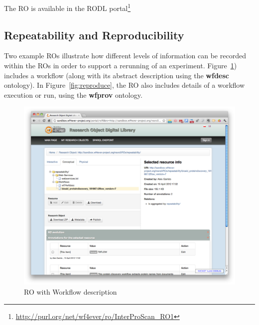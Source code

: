 The RO is available in the RODL portal\footnote{\url{http://purl.org/net/wf4ever/ro/InterProScan_RO1}}

\subsection{Repeatability and Reproducibility}

Two example ROs illustrate how different levels of information can be
recorded within the ROs in order to support a rerunning of an
experiment. Figure~\ref{fig:repeat}) includes a workflow (along with
its abstract description using the \textbf{wfdesc} ontology). In
Figure~\ref{fig:reproduce}, the RO also includes details of a workflow
execution or run, using the \textbf{wfprov} ontology.

\begin{figure}[h]
  \centering
  \includegraphics[width=\picwidth]{Figures/repeat}
 \caption{RO with Workflow description}
  \label{fig:repeat}
\end{figure}



